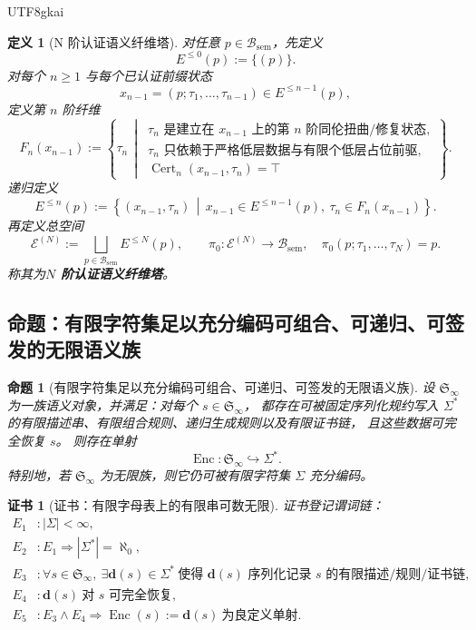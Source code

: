 \documentclass[12pt]{article}
\newtheorem{definition}{定义}[section]
\newtheorem{proposition}{命题}[section]
\newtheorem{Certificate}{证书}[section]
\newcommand{\Cert}{\operatorname{Cert}}
\begin{document}
\begin{CJK*}{UTF8}{gkai}
\begin{definition}[N 阶认证语义纤维塔]
\label{def:tex37-ch13-tower}
对任意 $p\in\mathcal B_{\mathrm{sem}}$，先定义
\[
  E^{\le 0}(p):=\{(p)\}.
\]
对每个 $n\ge 1$ 与每个已认证前缀状态
\[
  x_{n-1}=(p;\tau_1,\dots,\tau_{n-1})\in E^{\le n-1}(p),
\]
定义第 $n$ 阶纤维
\[
  F_n(x_{n-1})
  :=
  \left\{
    \tau_n
    \,\middle|\,
    \begin{array}{l}
      \tau_n\text{ 是建立在 }x_{n-1}\text{ 上的第 }n\text{ 阶同伦扭曲/修复状态},\\
      \tau_n\text{ 只依赖于严格低层数据与有限个低层占位前驱},\\
      \Cert_n(x_{n-1},\tau_n)=\top
    \end{array}
  \right\}.
\]
递归定义
\[
  E^{\le n}(p)
  :=
  \left\{
    (x_{n-1},\tau_n)
    \,\middle|\,
    x_{n-1}\in E^{\le n-1}(p),\ \tau_n\in F_n(x_{n-1})
  \right\}.
\]
再定义总空间
\[
  \mathcal E^{(N)}
  :=
  \bigsqcup_{p\in\mathcal B_{\mathrm{sem}}} E^{\le N}(p),
  \qquad
  \pi_0:\mathcal E^{(N)}\to \mathcal B_{\mathrm{sem}},
  \quad
  \pi_0(p;\tau_1,\dots,\tau_N)=p.
\]
称其为\textbf{$N$ 阶认证语义纤维塔}。
\end{definition}

\subsection{命题：有限字符集足以充分编码可组合、可递归、可签发的无限语义族}
\label{subsec:tex37-ch13-encoding}

\begin{proposition}[有限字符集足以充分编码可组合、可递归、可签发的无限语义族]
\label{prop:tex37-ch13-encoding}
设 $\mathfrak S_\infty$ 为一族语义对象，并满足：对每个 $s\in\mathfrak S_\infty$，
都存在可被固定序列化规约写入 $\Sigma^\ast$ 的有限描述串、有限组合规则、递归生成规则以及有限证书链，
且这些数据可完全恢复 $s$。
则存在单射
\[
  \operatorname{Enc}:\mathfrak S_\infty \hookrightarrow \Sigma^\ast.
\]
特别地，若 $\mathfrak S_\infty$ 为无限族，则它仍可被有限字符集 $\Sigma$ 充分编码。
\end{proposition}

\begin{Certificate}[证书：有限字母表上的有限串可数无限]
\label{cert:tex37-ch13-encoding}
证书登记谓词链：
\[
\begin{aligned}
  E_1 &: |\Sigma|<\infty,\\
  E_2 &: E_1\Rightarrow |\Sigma^\ast|=\aleph_0,\\
  E_3 &: \forall s\in\mathfrak S_\infty,\ \exists \mathbf d(s)\in \Sigma^\ast\ \text{使得 }\mathbf d(s)\text{ 序列化记录 }
    s\text{ 的有限描述/规则/证书链},\\
  E_4 &: \mathbf d(s)\ \text{对 }s\text{ 可完全恢复},\\
  E_5 &: E_3\wedge E_4\Rightarrow \operatorname{Enc}(s):=\mathbf d(s)\ \text{为良定义单射}.
\end{aligned}
\]
\end{Certificate}


\end{CJK*}
\end{document}
